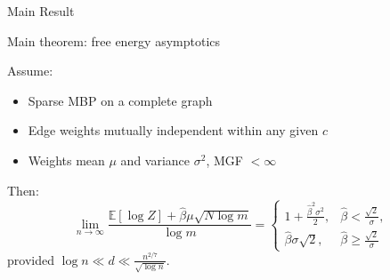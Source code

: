 \documentclass[presentation,12pt]{beamer}
\newcommand{\Expct}{\mathbb{E}}
\newcommand{\Var}{\mathrm{Var}}
\def\E{{\mathbb E}}
\begin{document}
\begin{frame}{Main Result}
\begin{block}{\rule[-0.6ex]{0pt}{2.5ex}Main theorem: free energy asymptotics}
  Assume:
  \begin{itemize}
    \item Sparse MBP on a complete graph
    \item Edge weights mutually independent
    within any given $c$
    \item Weights mean $\mu$ and variance $\sigma^2$, MGF $<\infty$
  \end{itemize}
  Then:
\[
\lim_{n\to \infty} \frac{\E[\log Z] +\hat \beta \mu \sqrt{N\log m}}{\log m} =
\left\{ \begin{array}{ll}
1+\frac{\hat \beta^2\sigma^2}{2}, &
\hat \beta< \frac{\sqrt{2}}{\sigma},\\
\hat \beta \sigma \sqrt{2}, & \hat \beta \ge \frac{\sqrt{2}}{\sigma}
\end{array}
\right.
\]
provided $\log n \ll d \ll \frac{n^{2/7}}{\sqrt{\log n}}$.

\end{block}
\end{frame}


\end{document}
